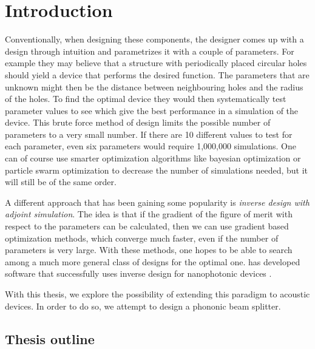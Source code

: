 \chapter{Introduction}


Conventionally, when designing these components, the designer comes up with a
design through intuition and parametrizes it with a couple of parameters.
For example they may believe that a structure with periodically placed circular
holes should yield a device that performs the desired function.
The parameters that are unknown might then be the distance between neighbouring
holes and the radius of the holes.
To find the optimal device they would then systematically test parameter values
to see which give the best performance in a simulation of the device.
This brute force method of design limits the possible number of parameters to a
very small number.
If there are 10 different values to test for each parameter, even six
parameters would require 1,000,000 simulations.
One can of course use smarter optimization algorithms like bayesian optimization
or particle swarm optimization\cite{zhang_compact_2013}
to decrease the number of simulations needed, but it will still be of the same
order.

A different approach that has been gaining some popularity is
\emph{inverse design with adjoint simulation}.%
\cite{molesky_inverse_2018}
The idea is that if the gradient of the figure of merit
with respect to the parameters can be calculated, then we can use gradient based
optimization methods, which converge much faster, even if the number of
parameters is very large. With these methods, one hopes to be able to search
among a much more general class of designs for the optimal one.
\citeauthor{spins2019} has developed software that successfully uses inverse design for
nanophotonic devices \cite{spins2019}.

With this thesis, we explore the possibility of extending this paradigm to
acoustic devices. In order to do so, we attempt to design a phononic beam
splitter.


\section{Thesis outline}
